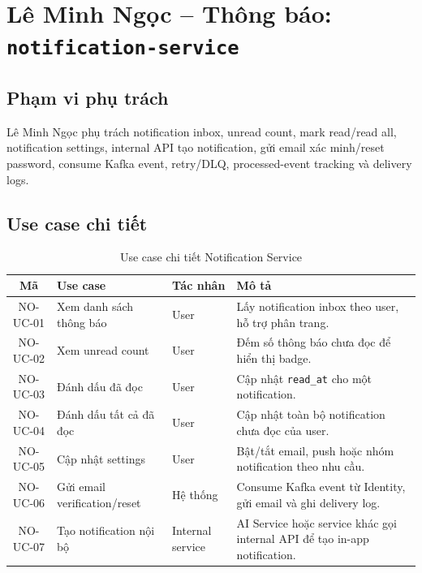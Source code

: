 \documentclass[14pt,a4paper,oneside]{extreport}
\begin{document}
\section{Lê Minh Ngọc -- Thông báo: \texttt{notification-service}}
\label{sec:phase3-notification}

\subsection{Phạm vi phụ trách}

Lê Minh Ngọc phụ trách notification inbox, unread count, mark read/read all, notification settings, internal API tạo notification, gửi email xác minh/reset password, consume Kafka event, retry/DLQ, processed-event tracking và delivery logs.

\subsection{Use case chi tiết}

\begin{table}[H]
\centering
\caption{Use case chi tiết Notification Service}
\label{tab:uc-notification}
\renewcommand{\arraystretch}{1.3}
\small
\begin{tabularx}{\textwidth}{|c|l|l|X|}
\hline
\textbf{Mã} & \textbf{Use case} & \textbf{Tác nhân} & \textbf{Mô tả} \\
\hline
NO-UC-01 & Xem danh sách thông báo & User & Lấy notification inbox theo user, hỗ trợ phân trang. \\
\hline
NO-UC-02 & Xem unread count & User & Đếm số thông báo chưa đọc để hiển thị badge. \\
\hline
NO-UC-03 & Đánh dấu đã đọc & User & Cập nhật \texttt{read\_at} cho một notification. \\
\hline
NO-UC-04 & Đánh dấu tất cả đã đọc & User & Cập nhật toàn bộ notification chưa đọc của user. \\
\hline
NO-UC-05 & Cập nhật settings & User & Bật/tắt email, push hoặc nhóm notification theo nhu cầu. \\
\hline
NO-UC-06 & Gửi email verification/reset & Hệ thống & Consume Kafka event từ Identity, gửi email và ghi delivery log. \\
\hline
NO-UC-07 & Tạo notification nội bộ & Internal service & AI Service hoặc service khác gọi internal API để tạo in-app notification. \\
\hline
\end{tabularx}
\end{table}
\end{document}
